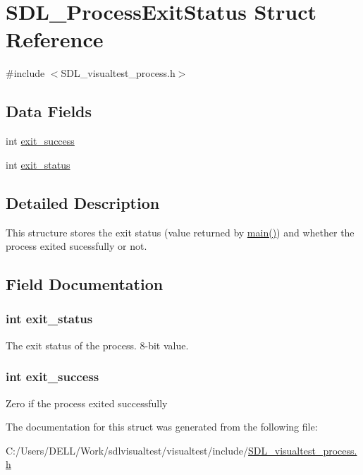 \hypertarget{struct_s_d_l___process_exit_status}{\section{S\-D\-L\-\_\-\-Process\-Exit\-Status Struct Reference}
\label{struct_s_d_l___process_exit_status}
}


{\ttfamily \#include $<$S\-D\-L\-\_\-visualtest\-\_\-process.\-h$>$}

\subsection*{Data Fields}
\begin{DoxyCompactItemize}
\item 
int \hyperlink{struct_s_d_l___process_exit_status_a51df50c07437f2e816d6ce7ce99e1cac}{exit\-\_\-success}
\item 
int \hyperlink{struct_s_d_l___process_exit_status_a9324a9ff7dc6697dd77f02998d5e77d7}{exit\-\_\-status}
\end{DoxyCompactItemize}


\subsection{Detailed Description}
This structure stores the exit status (value returned by \hyperlink{testharness_8c_a0ddf1224851353fc92bfbff6f499fa97}{main()}) and whether the process exited sucessfully or not. 

\subsection{Field Documentation}
\hypertarget{struct_s_d_l___process_exit_status_a9324a9ff7dc6697dd77f02998d5e77d7}{
\subsubsection[{exit\-\_\-status}]{\setlength{\rightskip}{0pt plus 5cm}int exit\-\_\-status}}\label{struct_s_d_l___process_exit_status_a9324a9ff7dc6697dd77f02998d5e77d7}
The exit status of the process. 8-\/bit value. \hypertarget{struct_s_d_l___process_exit_status_a51df50c07437f2e816d6ce7ce99e1cac}{
\subsubsection[{exit\-\_\-success}]{\setlength{\rightskip}{0pt plus 5cm}int exit\-\_\-success}}\label{struct_s_d_l___process_exit_status_a51df50c07437f2e816d6ce7ce99e1cac}
Zero if the process exited successfully 

The documentation for this struct was generated from the following file\-:\begin{DoxyCompactItemize}
\item 
C\-:/\-Users/\-D\-E\-L\-L/\-Work/sdlvisualtest/visualtest/include/\hyperlink{_s_d_l__visualtest__process_8h}{S\-D\-L\-\_\-visualtest\-\_\-process.\-h}\end{DoxyCompactItemize}
